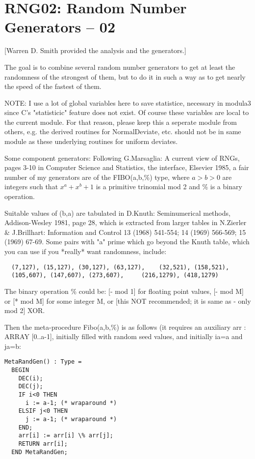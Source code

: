 \section{RNG02: Random Number Generators -- 02}
[Warren D. Smith provided the analysis and the generators.]

The goal is to combine several random number generators to get at least the 
randomness of the strongest of them, but to do it in such a way as
to get nearly the speed of the fastest of them.

NOTE: I use a lot of global variables here to save statistice,
necessary in modula3 since C's "statisticic" feature does not exist.
Of course these variables are local to the current module.
For that reason, please keep this a seperate module from others,
e.g. the derived routines for NormalDeviate, etc. should not be in
same module as these underlying routines for uniform deviates.

Some component generators:
Following G.Marsaglia: A current view of RNGs, pages 3-10 in
Computer Science and Statistics, the interface, Elsevier 1985,
a fair number of my generators are of the FIBO(a,b,\%) type, where
$a>b>0$ are integers such that $x^a+x^b+1$ is a primitive trinomial
mod 2 and \% is a binary operation.

Suitable values of (b,a) are tabulated in D.Knuth: Seminumerical methods,
Addison-Wesley 1981, page 28, which is extracted from larger tables in
N.Zierler \& J.Brillhart: Information and Control 13 (1968) 541-554;
14 (1969) 566-569; 15 (1969) 67-69. Some pairs with "a" prime which
go beyond the Knuth table, which you can use if you *really*
want randomness, include: 
\begin{verbatim}
  (7,127), (15,127), (30,127), (63,127),    (32,521), (158,521), 
  (105,607), (147,607), (273,607),     (216,1279), (418,1279)
\end{verbatim}

The binary operation \% could be: [- mod 1] for floating point values,
[- mod M] or [* mod M] for some integer M,
or [this NOT recommended; it is same as - only mod 2] XOR.

Then the meta-procedure Fibo(a,b,\%) is as follows (it
requires an auxiliary arr : ARRAY [0..a-1], initially filled with
random seed values, and initially ia=a and ja=b:

\begin{verbatim}
MetaRandGen() : Type =
  BEGIN
    DEC(i);
    DEC(j);
    IF i<0 THEN
      i := a-1; (* wraparound *)
    ELSIF j<0 THEN
      j := a-1; (* wraparound *)
    END;
    arr[i] := arr[i] \% arr[j];
    RETURN arr[i];
  END MetaRandGen;
\end{verbatim}

